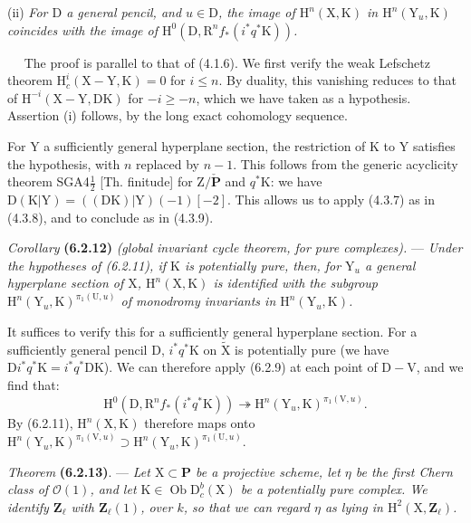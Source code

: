 \documentclass[11pt,leqno]{article}
\newcommand{\Page}[1]{\ifvmode\noindent\else\unskip\ \fi{\footnotesize\textcolor{gray}{[p.\,#1]}}\ \ignorespaces}
\begin{document}
(ii) \textit{For \(\mathrm{D}\) a general pencil, and \(u\in\mathrm{D}\), the image of \(\mathrm{H}^n(\mathrm{X},\mathrm{K})\) in \(\mathrm{H}^n(\mathrm{Y}_u,\mathrm{K})\) coincides with the image of \(\mathrm{H}^0(\mathrm{D},\mathrm{R}^nf_*(i^*q^*\mathrm{K}))\).}

\Page{250}
The proof is parallel to that of (4.1.6). We first verify the weak Lefschetz theorem \(\mathrm{H}_c^i(\mathrm{X}-\mathrm{Y},\mathrm{K})=0\) for \(i\leq n\). By duality, this vanishing reduces to that of \(\mathrm{H}^{-i}(\mathrm{X}-\mathrm{Y},\mathrm{DK})\) for \(-i\geq -n\), which we have taken as a hypothesis. Assertion (i) follows, by the long exact cohomology sequence.

For \(\mathrm{Y}\) a sufficiently general hyperplane section, the restriction of \(\mathrm{K}\) to \(\mathrm{Y}\) satisfies the hypothesis, with \(n\) replaced by \(n-1\). This follows from the generic acyclicity theorem SGA4\(\frac{1}{2}\) [Th. finitude] for \(\mathrm{Z}/\check{\mathbf{P}}\) and \(q^*\mathrm{K}\): we have \(\mathrm{D}(\mathrm{K}|\mathrm{Y})=((\mathrm{DK})|\mathrm{Y})(-1)[-2]\). This allows us to apply (4.3.7) as in (4.3.8), and to conclude as in (4.3.9).

\medskip
\textit{Corollary} \textbf{(6.2.12)} \textit{(global invariant cycle theorem, for pure complexes).} — \textit{Under the hypotheses of \textup{(6.2.11)}, if \(\mathrm{K}\) is potentially pure, then, for \(\mathrm{Y}_u\) a general hyperplane section of \(\mathrm{X}\), \(\mathrm{H}^n(\mathrm{X},\mathrm{K})\) is identified with the subgroup \(\mathrm{H}^n(\mathrm{Y}_u,\mathrm{K})^{\pi_1(\mathrm{U},u)}\) of monodromy invariants in \(\mathrm{H}^n(\mathrm{Y}_u,\mathrm{K})\).}

\medskip
It suffices to verify this for a sufficiently general hyperplane section. For a sufficiently general pencil \(\mathrm{D}\), \(i^*q^*\mathrm{K}\) on \(\widetilde{\mathrm{X}}\) is potentially pure (we have \(\mathrm{D}i^*q^*\mathrm{K}=i^*q^*\mathrm{DK}\)). We can therefore apply (6.2.9) at each point of \(\mathrm{D}-\mathrm{V}\), and we find that:
\[
\mathrm{H}^0(\mathrm{D},\mathrm{R}^nf_*(i^*q^*\mathrm{K}))
\twoheadrightarrow
\mathrm{H}^n(\mathrm{Y}_u,\mathrm{K})^{\pi_1(\mathrm{V},u)}.
\]
By (6.2.11), \(\mathrm{H}^n(\mathrm{X},\mathrm{K})\) therefore maps onto \(\mathrm{H}^n(\mathrm{Y}_u,\mathrm{K})^{\pi_1(\mathrm{V},u)}
\supset
\mathrm{H}^n(\mathrm{Y}_u,\mathrm{K})^{\pi_1(\mathrm{U},u)}\).

\medskip
\textit{Theorem} \textbf{(6.2.13)}. — \textit{Let \(\mathrm{X}\subset\mathbf{P}\) be a projective scheme, let \(\eta\) be the first Chern class of \(\mathcal{O}(1)\), and let \(\mathrm{K}\in\operatorname{Ob}\mathrm{D}_c^b(\mathrm{X})\) be a potentially pure complex. We identify \(\mathbf{Z}_{\ell}\) with \(\mathbf{Z}_{\ell}(1)\), over \(k\), so that we can regard \(\eta\) as lying in \(\mathrm{H}^2(\mathrm{X},\mathbf{Z}_{\ell})\).}
\end{document}
